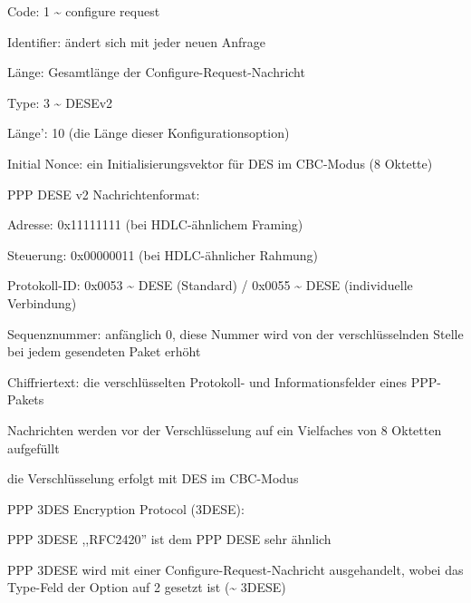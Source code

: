 \documentclass[a4paper]{article}
\begin{document}
\begin{multicols}{3}
\begin{itemize*}
\begin{itemize*}
                  \begin{itemize*} \item Code: 1 \textasciitilde{} configure request \item Identifier: ändert sich mit jeder neuen Anfrage \item Länge: Gesamtlänge der Configure-Request-Nachricht \item Type: 3 \textasciitilde{} DESEv2 \item Länge': 10 (die Länge dieser Konfigurationsoption) \item Initial Nonce: ein Initialisierungsvektor für DES im CBC-Modus (8 Oktette) \end{itemize*}
            \end{itemize*}
            \item PPP DESE v2 Nachrichtenformat:
            \begin{itemize*}
                  \item Adresse: 0x11111111 (bei HDLC-ähnlichem Framing)
                  \item Steuerung: 0x00000011 (bei HDLC-ähnlicher Rahmung)
                  \item Protokoll-ID: 0x0053 \textasciitilde{} DESE (Standard) / 0x0055 \textasciitilde{} DESE (individuelle Verbindung)
                  \item Sequenznummer: anfänglich 0, diese Nummer wird von der verschlüsselnden Stelle bei jedem gesendeten Paket erhöht
                  \item Chiffriertext: die verschlüsselten Protokoll- und Informationsfelder eines PPP-Pakets
                  \begin{itemize*} \item Nachrichten werden vor der Verschlüsselung auf ein Vielfaches von 8 Oktetten aufgefüllt \item die Verschlüsselung erfolgt mit DES im CBC-Modus \end{itemize*}
            \end{itemize*}
            \item PPP 3DES Encryption Protocol (3DESE):
            \begin{itemize*}
                  \item PPP 3DESE ,,RFC2420'' ist dem PPP DESE sehr ähnlich
                  \item PPP 3DESE wird mit einer Configure-Request-Nachricht ausgehandelt, wobei das Type-Feld der Option auf 2 gesetzt ist (\textasciitilde{} 3DESE)

\end{itemize*}
\end{itemize*}
\end{multicols}
\end{document}
